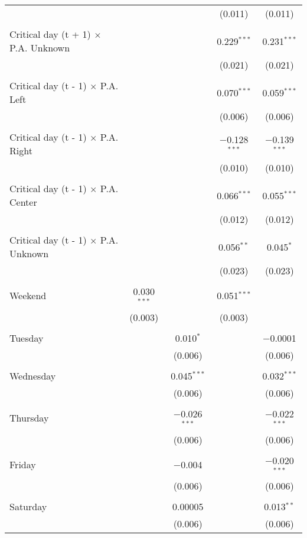 \documentclass[
]{article}
\begin{document}
\begin{table}[!htbp]
{\begin{tabular}{@{\extracolsep{5pt}}lcccc}
  &  &  & (0.011) & (0.011) \\ 
  & & & & \\ 
 Critical day (t + 1) $\times$ P.A. Unknown &  &  & 0.229$^{***}$ & 0.231$^{***}$ \\ 
  &  &  & (0.021) & (0.021) \\ 
  & & & & \\ 
 Critical day (t - 1) $\times$ P.A. Left &  &  & 0.070$^{***}$ & 0.059$^{***}$ \\ 
  &  &  & (0.006) & (0.006) \\ 
  & & & & \\ 
 Critical day (t - 1) $\times$ P.A. Right &  &  & $-$0.128$^{***}$ & $-$0.139$^{***}$ \\ 
  &  &  & (0.010) & (0.010) \\ 
  & & & & \\ 
 Critical day (t - 1) $\times$ P.A. Center &  &  & 0.066$^{***}$ & 0.055$^{***}$ \\ 
  &  &  & (0.012) & (0.012) \\ 
  & & & & \\ 
 Critical day (t - 1) $\times$ P.A. Unknown &  &  & 0.056$^{**}$ & 0.045$^{*}$ \\ 
  &  &  & (0.023) & (0.023) \\ 
  & & & & \\ 
 Weekend & 0.030$^{***}$ &  & 0.051$^{***}$ &  \\ 
  & (0.003) &  & (0.003) &  \\ 
  & & & & \\ 
 Tuesday &  & 0.010$^{*}$ &  & $-$0.0001 \\ 
  &  & (0.006) &  & (0.006) \\ 
  & & & & \\ 
 Wednesday &  & 0.045$^{***}$ &  & 0.032$^{***}$ \\ 
  &  & (0.006) &  & (0.006) \\ 
  & & & & \\ 
 Thursday &  & $-$0.026$^{***}$ &  & $-$0.022$^{***}$ \\ 
  &  & (0.006) &  & (0.006) \\ 
  & & & & \\ 
 Friday &  & $-$0.004 &  & $-$0.020$^{***}$ \\ 
  &  & (0.006) &  & (0.006) \\ 
  & & & & \\ 
 Saturday &  & 0.00005 &  & 0.013$^{**}$ \\ 
  &  & (0.006) &  & (0.006) \\ 

\end{tabular}}
\end{table}
\end{document}
